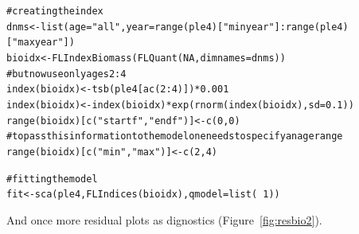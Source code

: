 \documentclass[a4paper,english,10pt]{article}\usepackage[]{graphicx}\usepackage[]{color}
\makeatletter
\newcommand{\hlnum}[1]{\textcolor[rgb]{0.063,0.58,0.627}{#1}}%
\newcommand{\hlstr}[1]{\textcolor[rgb]{0.063,0.58,0.627}{#1}}%
\newcommand{\hlcom}[1]{\textcolor[rgb]{0.588,0.588,0.588}{#1}}%
\newcommand{\hlopt}[1]{\textcolor[rgb]{0.196,0.196,0.196}{#1}}%
\newcommand{\hlstd}[1]{\textcolor[rgb]{0.196,0.196,0.196}{#1}}%
\newcommand{\hlkwb}[1]{\textcolor[rgb]{0.627,0,0.314}{#1}}%
\newcommand{\hlkwc}[1]{\textcolor[rgb]{0,0.631,0.314}{#1}}%
\newcommand{\hlkwd}[1]{\textcolor[rgb]{0.78,0.227,0.412}{#1}}%
\newenvironment{kframe}{%
 \def\at@end@of@kframe{}%
 \ifinner\ifhmode%
  \def\at@end@of@kframe{\end{minipage}}%
  \begin{minipage}{\columnwidth}%
 \fi\fi%
 \def\FrameCommand##1{\hskip\@totalleftmargin \hskip-\fboxsep
 \colorbox{shadecolor}{##1}\hskip-\fboxsep
     \hskip-\linewidth \hskip-\@totalleftmargin \hskip\columnwidth}%
 \MakeFramed {\advance\hsize-\width
   \@totalleftmargin\z@ \linewidth\hsize
   \@setminipage}}%
 {\par\unskip\endMakeFramed%
 \at@end@of@kframe}
\newenvironment{knitrout}{}{} %
\makeatother
\begin{document}
\begin{knitrout}
\color{fgcolor}\begin{kframe}
\begin{alltt}
\hlcom{# creating the index}
\hlstd{dnms} \hlkwb{<-} \hlkwd{list}\hlstd{(}\hlkwc{age} \hlstd{=} \hlstr{"all"}\hlstd{,} \hlkwc{year} \hlstd{=} \hlkwd{range}\hlstd{(ple4)[}\hlstr{"minyear"}\hlstd{]}\hlopt{:}\hlkwd{range}\hlstd{(ple4)[}\hlstr{"maxyear"}\hlstd{])}
\hlstd{bioidx} \hlkwb{<-} \hlkwd{FLIndexBiomass}\hlstd{(}\hlkwd{FLQuant}\hlstd{(}\hlnum{NA}\hlstd{,} \hlkwc{dimnames} \hlstd{= dnms))}
\hlcom{# but now use only ages 2:4}
\hlkwd{index}\hlstd{(bioidx)} \hlkwb{<-} \hlkwd{tsb}\hlstd{(ple4[}\hlkwd{ac}\hlstd{(}\hlnum{2}\hlopt{:}\hlnum{4}\hlstd{)])} \hlopt{*} \hlnum{0.001}
\hlkwd{index}\hlstd{(bioidx)} \hlkwb{<-} \hlkwd{index}\hlstd{(bioidx)} \hlopt{*} \hlkwd{exp}\hlstd{(}\hlkwd{rnorm}\hlstd{(}\hlkwd{index}\hlstd{(bioidx),} \hlkwc{sd} \hlstd{=} \hlnum{0.1}\hlstd{))}
\hlkwd{range}\hlstd{(bioidx)[}\hlkwd{c}\hlstd{(}\hlstr{"startf"}\hlstd{,} \hlstr{"endf"}\hlstd{)]} \hlkwb{<-} \hlkwd{c}\hlstd{(}\hlnum{0}\hlstd{,} \hlnum{0}\hlstd{)}
\hlcom{# to pass this information to the model one needs to specify an age range}
\hlkwd{range}\hlstd{(bioidx)[}\hlkwd{c}\hlstd{(}\hlstr{"min"}\hlstd{,} \hlstr{"max"}\hlstd{)]} \hlkwb{<-} \hlkwd{c}\hlstd{(}\hlnum{2}\hlstd{,} \hlnum{4}\hlstd{)}

\hlcom{# fitting the model}
\hlstd{fit} \hlkwb{<-} \hlkwd{sca}\hlstd{(ple4,} \hlkwd{FLIndices}\hlstd{(bioidx),} \hlkwc{qmodel} \hlstd{=} \hlkwd{list}\hlstd{(}\hlopt{~}\hlnum{1}\hlstd{))}
\end{alltt}
\end{kframe}
\end{knitrout}

And once more residual plots as dignostics (Figure~\ref{fig:resbio2}).
\end{document}
